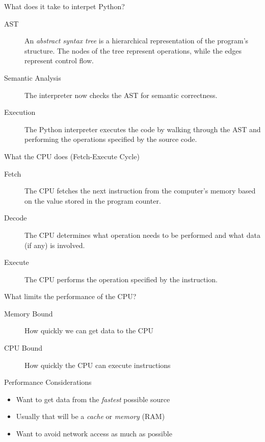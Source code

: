 \documentclass[12pt, aspectration=169]{beamer}
\begin{document}
    \begin{frame}{What does it take to interpet Python?}
        \begin{description}
            \item[AST] An \textit{abstract syntax tree} is a hierarchical representation of the program's structure.
            The nodes of the tree represent operations, while the edges represent control flow.
            \item[Semantic Analysis] The interpreter now checks the AST for semantic correctness.
            \item[Execution] The Python interpreter executes the code by walking through the AST and performing the operations specified by the source code.
        \end{description}
    \end{frame}

    \begin{frame}{What the CPU does (Fetch-Execute Cycle)}
        \begin{description}
            \item[Fetch] The CPU fetches the next instruction from the computer's memory based on the value stored in the program counter.
            \item[Decode] The CPU determines what operation needs to be performed and what data (if any) is involved.
            \item[Execute] The CPU performs the operation specified by the instruction.
        \end{description}
    \end{frame}

    \begin{frame}{What limits the performance of the CPU?}
        \begin{description}
            \item[Memory Bound] How quickly we can get data to the CPU
            \item[CPU Bound] How quickly the CPU can execute instructions
        \end{description}
    \end{frame}

    \begin{frame}{Performance Considerations}
        \begin{itemize}
            \item Want to get data from the \textit{fastest} possible source
            \item Usually that will be a \textit{cache} or \textit{memory} (RAM)
            \item Want to avoid network access as much as possible
        \end{itemize}
    \end{frame}
\end{document}
